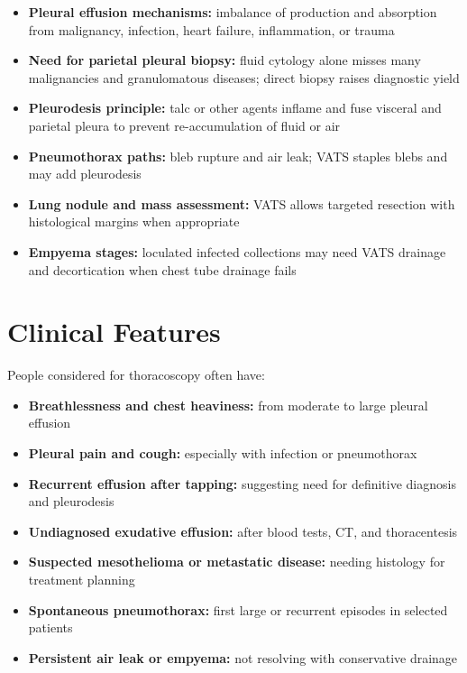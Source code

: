 \begin{itemize}
    \item \textbf{Pleural effusion mechanisms:} imbalance of production and absorption from malignancy, infection, heart failure, inflammation, or trauma
    \item \textbf{Need for parietal pleural biopsy:} fluid cytology alone misses many malignancies and granulomatous diseases; direct biopsy raises diagnostic yield
    \item \textbf{Pleurodesis principle:} talc or other agents inflame and fuse visceral and parietal pleura to prevent re-accumulation of fluid or air
    \item \textbf{Pneumothorax paths:} bleb rupture and air leak; VATS staples blebs and may add pleurodesis
    \item \textbf{Lung nodule and mass assessment:} VATS allows targeted resection with histological margins when appropriate
    \item \textbf{Empyema stages:} loculated infected collections may need VATS drainage and decortication when chest tube drainage fails
\end{itemize}

\section*{Clinical Features}
People considered for thoracoscopy often have:

\begin{itemize}
    \item \textbf{Breathlessness and chest heaviness:} from moderate to large pleural effusion
    \item \textbf{Pleural pain and cough:} especially with infection or pneumothorax
    \item \textbf{Recurrent effusion after tapping:} suggesting need for definitive diagnosis and pleurodesis
    \item \textbf{Undiagnosed exudative effusion:} after blood tests, CT, and thoracentesis
    \item \textbf{Suspected mesothelioma or metastatic disease:} needing histology for treatment planning
    \item \textbf{Spontaneous pneumothorax:} first large or recurrent episodes in selected patients
    \item \textbf{Persistent air leak or empyema:} not resolving with conservative drainage
\end{itemize}

